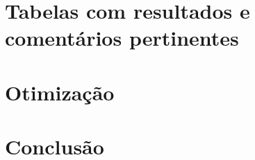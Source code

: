 \documentclass[a4paper,10pt]{article}
\begin{document}




\pagebreak

\section{Tabelas com resultados e comentários pertinentes}
\pagebreak

\section{Otimização}
\pagebreak

\section{Conclusão}

\pagebreak
\end{document}
